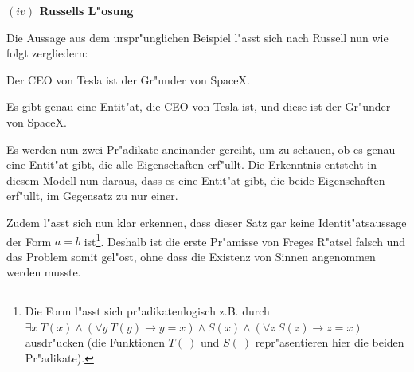 \documentclass[a4paper, emulatestandardclasses, 12pt]{scrartcl}
\begin{document}
\begin{onehalfspace}
\vspace{3mm}

\noindent\textbf{$(iv)$ Russells L"osung}

\noindent Die Aussage aus dem urspr"unglichen Beispiel l"asst sich nach Russell nun wie folgt zergliedern:

\begin{description}[leftmargin=!,labelwidth=\widthof{\bfseries Zergliederung}]
    \item[Originalsatz] Der CEO von Tesla ist der Gr"under von SpaceX.
    \item[Zergliederung] Es gibt genau eine Entit"at, die CEO von Tesla ist, und diese ist der Gr"under von SpaceX. 
\end{description}

Es werden nun zwei Pr"adikate aneinander gereiht, um zu schauen, ob es genau eine Entit"at gibt, die alle Eigenschaften erf"ullt. Die Erkenntnis entsteht in diesem Modell nun daraus, dass es eine Entit"at gibt, die beide Eigenschaften erf"ullt, im Gegensatz zu nur einer.  

Zudem l"asst sich nun klar erkennen, dass dieser Satz gar keine Identit"atsaussage der Form $a = b$ ist\footnote{Die Form l"asst sich pr"adikatenlogisch z.B. durch $\exists x~T(x) \wedge (\forall y~T(y) \rightarrow y = x) \wedge S(x) \wedge (\forall z~S(z) \rightarrow z = x)$ ausdr"ucken (die Funktionen $T(~)$ und $S(~)$ repr"asentieren hier die beiden Pr"adikate).}. Deshalb ist die erste Pr"amisse von Freges R"atsel falsch und das Problem somit gel"ost, ohne dass die Existenz von Sinnen angenommen werden musste. 



\vspace{3mm}




\end{onehalfspace}


\end{document}
